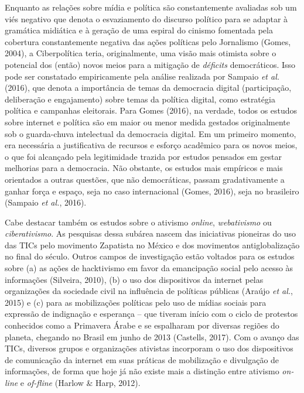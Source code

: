 Enquanto as relações sobre mídia e política são constantemente avaliadas
sob um viés negativo que denota o esvaziamento do discurso político para
se adaptar à gramática midiática e à geração de uma espiral do cinismo
fomentada pela cobertura constantemente negativa das ações políticas
pelo Jornalismo (Gomes, 2004), a Ciberpolítica teria, originalmente, uma
visão mais otimista sobre o potencial dos (então) novos meios para a
mitigação de \emph{déficits} democráticos. Isso pode ser constatado
empiricamente pela análise realizada por Sampaio \emph{et al.} (2016),
que denota a importância de temas da democracia digital (participação,
deliberação e engajamento) sobre temas da política digital, como
estratégia política e campanhas eleitorais. Para Gomes (2016), na
verdade, todos os estudos sobre internet e política são em maior ou
menor medida gestados originalmente sob o guarda-chuva intelectual da
democracia digital. Em um primeiro momento, era necessária a
justificativa de recursos e esforço acadêmico para os novos meios, o que
foi alcançado pela legitimidade trazida por estudos pensados em gestar
melhorias para a democracia. Não obstante, os estudos mais empíricos e
mais orientados a outras questões, que não democráticas, passam
gradativamente a ganhar força e espaço, seja no caso internacional
(Gomes, 2016), seja no brasileiro (Sampaio \emph{et al.}, 2016).

Cabe destacar também os estudos sobre o ativismo \emph{online},
\emph{webativismo} ou \emph{ciberativismo}. As pesquisas dessa subárea
nascem das iniciativas pioneiras do uso das TICs pelo movimento
Zapatista no México e dos movimentos antiglobalização no final do
século. Outros campos de investigação estão voltados para os estudos
sobre (a) as ações de hacktivismo em favor da emancipação social pelo
acesso às informações (Silveira, 2010), (b) o uso dos dispositivos da
internet pelas organizações da sociedade civil na influência de
políticas públicas (Araújo \emph{et al.}, 2015) e (c) para as
mobilizações políticas pelo uso de mídias sociais para expressão de
indignação e esperança -- que tiveram início com o ciclo de protestos
conhecidos como a Primavera Árabe e se espalharam por diversas regiões
do planeta, chegando no Brasil em junho de 2013 (Castells, 2017). Com o
avanço das TICs, diversos grupos e organizações ativistas incorporam o
uso dos dispositivos de comunicação da internet em suas práticas de
mobilização e divulgação de informações, de forma que hoje já não existe
mais a distinção entre ativismo \emph{on-line} e \emph{of-fline} (Harlow
\& Harp, 2012).


